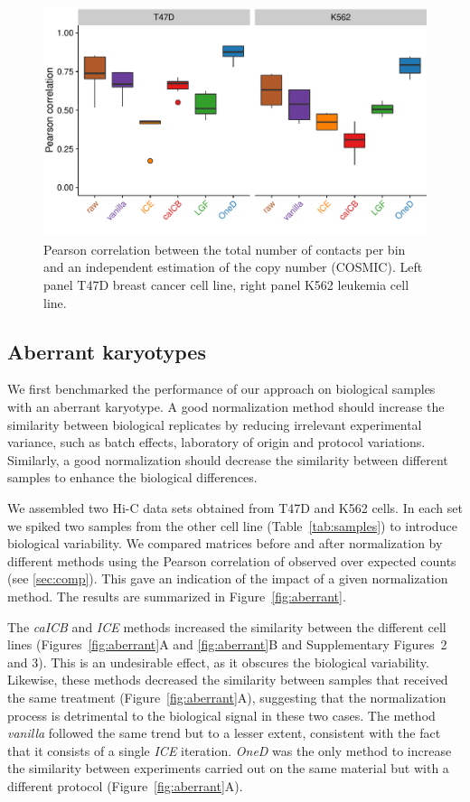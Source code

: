 \documentclass{article}
\begin{document}
\begin{figure}
	\centerline{\includegraphics[width=.99\textwidth]
{img/copy_number_figure2.pdf}}
\caption{Pearson correlation between the total number of contacts per bin
and an independent estimation of the copy number (COSMIC). Left panel
T47D breast cancer cell line, right panel K562 leukemia cell line.}
\label{fig:copy_number}
\end{figure}




\subsection{Aberrant karyotypes}

We first benchmarked the performance of our approach on biological
samples with an aberrant karyotype. A good normalization method should
increase the similarity between biological replicates by reducing
irrelevant experimental variance, such as batch effects, laboratory of
origin and protocol variations. Similarly, a good normalization should
decrease the similarity between different samples to enhance the
biological differences.

We assembled two Hi-C data sets obtained from T47D and K562 cells.  In
each set we spiked two samples from the other cell line
(Table~\ref{tab:samples}) to introduce biological variability. We compared
matrices before and after normalization by different methods using the
Pearson correlation of observed over expected counts (see \ref{sec:comp}).
This gave an indication of the impact of a given normalization method. The
results are summarized in Figure~\ref{fig:aberrant}.

The \textit{caICB} and \textit{ICE} methods increased the similarity
between the different cell lines (Figures~\ref{fig:aberrant}A and
\ref{fig:aberrant}B and Supplementary Figures~2 and 3). This is an
undesirable effect, as it obscures the biological variability. Likewise,
these methods decreased the similarity between samples that received the
same treatment (Figure~\ref{fig:aberrant}A), suggesting that the
normalization process is detrimental to the biological signal in these two
cases. The method \textit{vanilla} followed the same trend but to a lesser
extent, consistent with the fact that it consists of a single \textit{ICE}
iteration. \textit{OneD} was the only method to increase the similarity
between experiments carried out on the same material but with a different
protocol (Figure~\ref{fig:aberrant}A).
\end{document}
